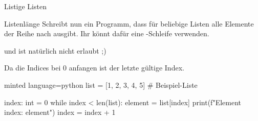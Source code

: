 \begin{task}[points=auto]{Listige Listen}
\begin{subtask*}[points=0]{Listenlänge }
        Schreibt nun ein Programm, dass für beliebige Listen alle Elemente der Reihe
        nach ausgibt. Ihr könnt dafür eine -Schleife verwenden.

        \begin{anmerkung}
             und  ist natürlich nicht erlaubt ;)
        \end{anmerkung}
        \begin{solution}
            Da die Indices bei 0 anfangen ist  der letzte gültige Index.

            \begin{codeBlock}[]{minted language=python}
                list = [1, 2, 3, 4, 5] # Beispiel-Liste

                index: int = 0
                while index < len(list):
                    element = list[index]
                    print(f"Element {index}: {element}")
                    index = index + 1
            \end{codeBlock}
        \end{solution}
    \end{subtask*}
\end{task}

